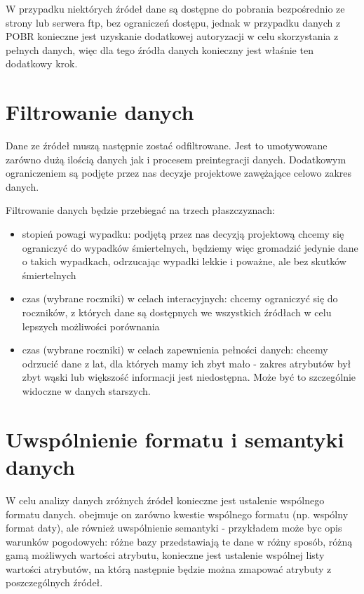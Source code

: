 W przypadku niektórych źródeł dane są dostępne do pobrania bezpośrednio
ze strony lub serwera ftp, bez ograniczeń dostępu, jednak w przypadku
danych z POBR konieczne jest uzyskanie dodatkowej autoryzacji w celu
skorzystania z pełnych danych, więc dla tego źródła danych konieczny
jest właśnie ten dodatkowy krok.

\section{Filtrowanie danych}\label{filtrowanie-danych}

Dane ze źródeł muszą następnie zostać odfiltrowane. Jest to umotywowane
zarówno dużą ilością danych jak i procesem preintegracji danych.
Dodatkowym ograniczeniem są podjęte przez nas decyzje projektowe
zawężające celowo zakres danych.

Filtrowanie danych będzie przebiegać na trzech płaszczyznach:

\begin{itemize}
\itemsep-14pt\parskip0pt
\item
  stopień powagi wypadku: podjętą przez nas decyzją projektową chcemy
  się ograniczyć do wypadków śmiertelnych, będziemy więc gromadzić
  jedynie dane o takich wypadkach, odrzucając wypadki lekkie i poważne,
  ale bez skutków śmiertelnych\\
\item
  czas (wybrane roczniki) w celach interacyjnych: chcemy ograniczyć się
  do roczników, z których dane są dostępnych we wszystkich źródłach w
  celu lepszych możliwości porównania\\
\item
  czas (wybrane roczniki) w celach zapewnienia pełności danych: chcemy
  odrzucić dane z lat, dla których mamy ich zbyt mało - zakres atrybutów
  był zbyt wąski lub większość informacji jest niedostępna. Może być to
  szczególnie widoczne w danych starszych.
\end{itemize}

\section{Uwspólnienie formatu i semantyki danych}\label{uwspolnienie-formatu-i-semantyki-danych}

W celu analizy danych zróżnych źródeł konieczne jest ustalenie wspólnego
formatu danych. obejmuje on zarówno kwestie wspólnego formatu (np.
wspólny format daty), ale również uwspólnienie semantyki - przykładem
może byc opis warunków pogodowych: różne bazy przedstawiają te dane w
różny sposób, różną gamą możliwych wartości atrybutu, konieczne jest
ustalenie wspólnej listy wartości atrybutów, na którą następnie będzie
można zmapować atrybuty z poszczególnych źródeł.

